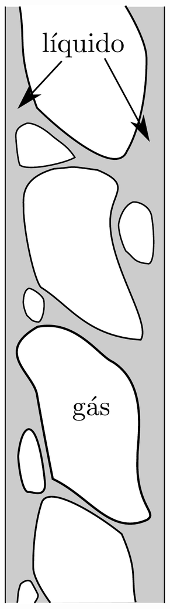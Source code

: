 \begin{figure}[h!]
\begin{center}
		{\includegraphics[angle=00, scale=0.3]{figs/v_churn.pdf}
		\hspace{0.8cm}}

\end{center}
\end{figure}
